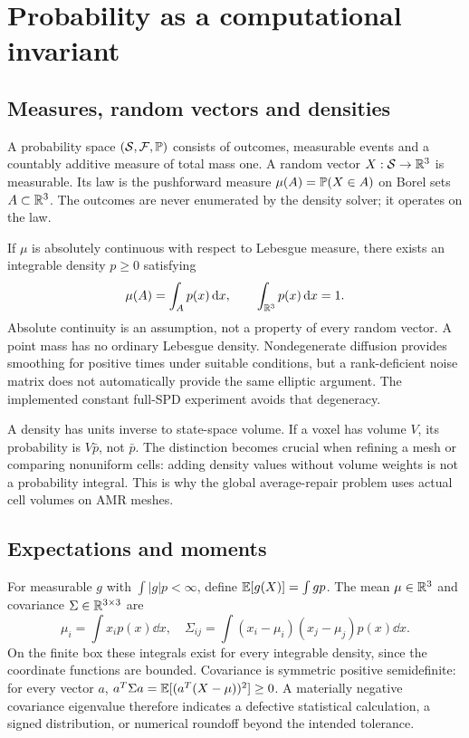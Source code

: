 
\chapter{Probability as a computational invariant}\label{ch:probability}
\section{Measures, random vectors and densities}
A probability space $(\mathcal S,\mathcal F,\mathbb P)$ consists of outcomes, measurable events and a countably additive measure of total mass one. A random vector $X:\mathcal S\to\mathbb R^3$ is measurable. Its law is the pushforward measure $\mu(A)=\mathbb P(X\in A)$ on Borel sets $A\subset\mathbb R^3$. The outcomes are never enumerated by the density solver; it operates on the law.

If $\mu$ is absolutely continuous with respect to Lebesgue measure, there exists an integrable density $p\ge0$ satisfying
\begin{equation}\label{eq:density-def}
\mu(A)=\int_A p(x)\,\mathrm d x,\qquad \int_{\mathbb R^3}p(x)\,\mathrm d x=1.
\end{equation}
Absolute continuity is an assumption, not a property of every random vector. A point mass has no ordinary Lebesgue density. Nondegenerate diffusion provides smoothing for positive times under suitable conditions, but a rank-deficient noise matrix does not automatically provide the same elliptic argument. The implemented constant full-SPD experiment avoids that degeneracy.

A density has units inverse to state-space volume. If a voxel has volume $V$, its probability is $V\bar p$, not $\bar p$. The distinction becomes crucial when refining a mesh or comparing nonuniform cells: adding density values without volume weights is not a probability integral. This is why the global average-repair problem uses actual cell volumes on AMR meshes.

\section{Expectations and moments}
For measurable $g$ with $\int|g|p<\infty$, define $\mathbb E[g(X)]=\int gp$. The mean $\mu\in\mathbb R^3$ and covariance $\Sigma\in\mathbb R^{3\times3}$ are
\begin{equation}\label{eq:moments}
\mu_i=\int x_i p(x)\dd x,\quad
\Sigma_{ij}=\int(x_i-\mu_i)(x_j-\mu_j)p(x)\dd x.
\end{equation}
On the finite box these integrals exist for every integrable density, since the coordinate functions are bounded. Covariance is symmetric positive semidefinite: for every vector $a$, $a^T\Sigma a=\mathbb E[(a^T(X-\mu))^2]\ge0$. A materially negative covariance eigenvalue therefore indicates a defective statistical calculation, a signed distribution, or numerical roundoff beyond the intended tolerance.

